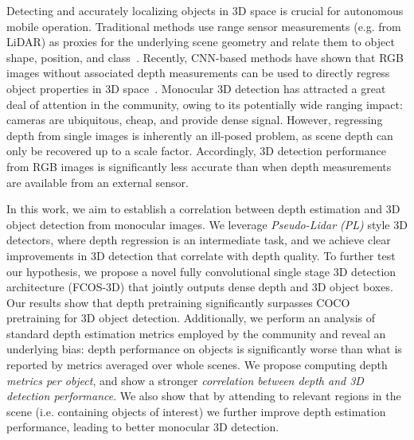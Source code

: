 

Detecting and accurately localizing objects in 3D space is crucial for autonomous mobile operation. Traditional methods use range sensor measurements (e.g. from LiDAR) as proxies for the underlying scene geometry and relate them to object shape, position, and class~\cite{qi2018frustum}. Recently, CNN-based methods have shown that RGB images without associated depth measurements can be used to directly regress object properties in 3D space~\cite{kehl2017ssd,simonelli2019disentangling}. Monocular 3D detection has attracted a great deal of attention in the community, owing to its potentially wide ranging impact: cameras are ubiquitous, cheap, and provide dense signal. However, regressing depth from single images is inherently an ill-posed problem, as scene depth can only be recovered up to a scale factor. Accordingly, 3D detection performance from RGB images is significantly less accurate than when depth measurements are available from an external sensor. 


In this work, we aim to establish a correlation between depth estimation and 3D object detection from monocular images. We leverage \textit{Pseudo-Lidar (PL)} style 3D detectors, where depth regression is an intermediate task, and we achieve clear improvements in 3D detection that correlate with depth quality. To further test our hypothesis, we propose a novel fully convolutional single stage 3D detection architecture (FCOS-3D) that jointly outputs dense depth and 3D object boxes. Our results show that depth pretraining significantly surpasses COCO~\cite{lin2014microsoft} pretraining for 3D object detection. Additionally, we perform an analysis of standard depth estimation metrics employed by the community and reveal an underlying bias: depth performance on objects is significantly worse than what is reported by metrics averaged over whole scenes. We propose computing depth \textit{metrics per object}, and show a stronger \textit{correlation between depth and 3D detection performance}. We also show that by attending to relevant regions in the scene (i.e. containing objects of interest) we further improve depth estimation performance, leading to better monocular 3D detection.

